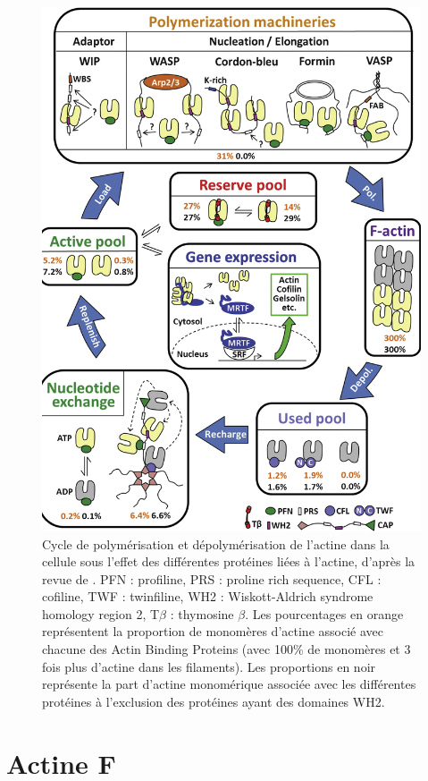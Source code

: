 \begin{figure}
\includegraphics[scale=0.25]{actine_cycle.png}
\caption{Cycle de polymérisation et dépolymérisation de l'actine dans la cellule sous l'effet des différentes protéines liées à l'actine, d'après la revue de \cite{xue_guardians_2013}. PFN : profiline, PRS : proline rich sequence, CFL : cofiline, TWF : twinfiline, WH2 : Wiskott-Aldrich syndrome homology region 2, T$\beta$ : thymosine $\beta$. Les pourcentages en orange représentent la proportion de monomères d'actine associé avec chacune des Actin Binding Proteins (avec 100\% de monomères et 3 fois plus d'actine dans les filaments). Les proportions en noir représente la part d'actine monomérique associée avec les différentes protéines à l'exclusion des protéines ayant des domaines WH2.}
\end{figure}

\section{Actine F}

